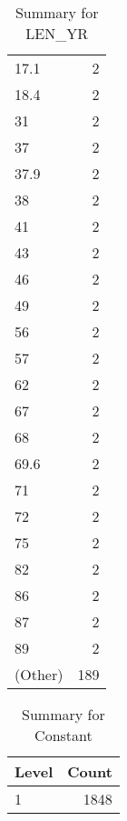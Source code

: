 \begin{table}[ht]
\begin{tabular}{lr}
  17.1 &   2 \\ 
  18.4 &   2 \\ 
  31 &   2 \\ 
  37 &   2 \\ 
  37.9 &   2 \\ 
  38 &   2 \\ 
  41 &   2 \\ 
  43 &   2 \\ 
  46 &   2 \\ 
  49 &   2 \\ 
  56 &   2 \\ 
  57 &   2 \\ 
  62 &   2 \\ 
  67 &   2 \\ 
  68 &   2 \\ 
  69.6 &   2 \\ 
  71 &   2 \\ 
  72 &   2 \\ 
  75 &   2 \\ 
  82 &   2 \\ 
  86 &   2 \\ 
  87 &   2 \\ 
  89 &   2 \\ 
  (Other) & 189 \\ 
   \hline
\end{tabular}
\caption{Summary for LEN_YR} 
\label{tab: LEN_YR}
\end{table}
\begin{table}[ht]
\centering
\begin{tabular}{lr}
  \hline
Level & Count \\ 
  \hline
1 & 1848 \\ 
   \hline
\end{tabular}
\caption{Summary for Constant} 
\label{tab: Constant}
\end{table}

